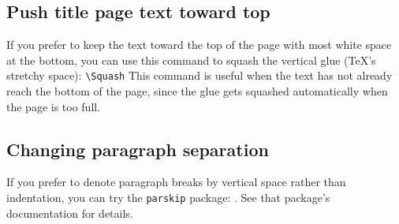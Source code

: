 \documentclass[11pt]{article}
\begin{document}
\subsection{Push title page text toward top} If you prefer to keep the text toward the top of the page with most white space at the bottom, you
can use this command to squash the vertical glue (\TeX's stretchy space):
	\vskip 5pt
	\quad\verb|\Squash| 
	\vskip 5pt
\noindent This command is useful when the text has not already reach the bottom of the page, since the glue gets squashed automatically when the page is too full.

\subsection{Changing paragraph separation}
If you prefer to denote paragraph breaks by vertical space rather than indentation, you can try the \texttt{parskip} package: . See that package's documentation for details.
\end{document}
